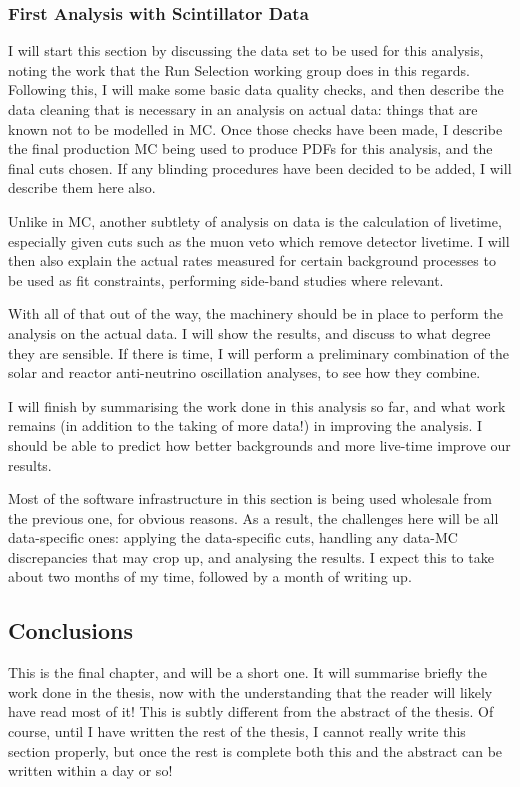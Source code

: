 \subsubsection{First Analysis with Scintillator Data}
I will start this section by discussing the data set to be used for this analysis, noting the work that the Run Selection working group does in this regards. Following this, I will make some basic data quality checks, and then describe the data cleaning that is necessary in an analysis on actual data: things that are known not to be modelled in MC. Once those checks have been made, I describe the final production MC being used to produce PDFs for this analysis, and the final cuts chosen. If any blinding procedures have been decided to be added, I will describe them here also.

Unlike in MC, another subtlety of analysis on data is the calculation of livetime, especially given cuts such as the muon veto which remove detector livetime. I will then also explain the actual rates measured for certain background processes to be used as fit constraints, performing side-band studies where relevant.

With all of that out of the way, the machinery should be in place to perform the analysis on the actual data. I will show the results, and discuss to what degree they are sensible. If there is time, I will perform a preliminary combination of the solar and reactor anti-neutrino oscillation analyses, to see how they combine.

I will finish by summarising the work done in this analysis so far, and what work remains (in addition to the taking of more data!) in improving the analysis. I should be able to predict how better backgrounds and more live-time improve our results.

Most of the software infrastructure in this section is being used wholesale from the previous one, for obvious reasons. As a result, the challenges here will be all data-specific ones: applying the data-specific cuts, handling any data-MC discrepancies that may crop up, and analysing the results. I expect this to take about two months of my time, followed by a month of writing up.

\subsection{Conclusions}
This is the final chapter, and will be a short one. It will summarise briefly the work done in the thesis, now with the understanding that the reader will likely have read most of it! This is subtly different from the abstract of the thesis. Of course, until I have written the rest of the thesis, I cannot really write this section properly, but once the rest is complete both this and the abstract can be written within a day or so!